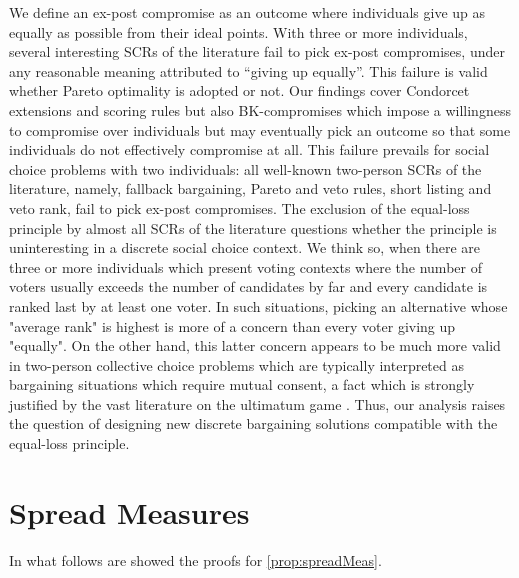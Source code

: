\documentclass[version=3.21, pagesize, twoside=off, bibliography=totoc, DIV=calc, fontsize=12pt, a4paper]{scrartcl}
\begin{document}
We define an ex-post compromise as an outcome where individuals give up as equally as possible from their ideal points. With three or more individuals, several interesting \acp{SCR} of the literature fail to pick ex-post compromises, under any reasonable meaning attributed to “giving up equally”. This failure is valid whether Pareto optimality is adopted or not. Our findings cover Condorcet extensions and scoring rules but also BK-compromises which impose a willingness to compromise over individuals but may eventually pick an outcome so that some individuals do not effectively compromise at all. This failure prevails for social choice problems with two individuals: all well-known two-person \acp{SCR} of the literature, namely, fallback bargaining, Pareto and veto rules, short listing and veto rank, fail to pick ex-post compromises. 
The exclusion of the equal-loss principle by almost all \acp{SCR} of the literature questions whether the principle is uninteresting in a discrete social choice context. We think so, when there are three or more individuals which present voting contexts where the number of voters usually exceeds the number of candidates by far and every candidate is ranked last by at least one voter. In such situations, picking an alternative whose "average rank" is highest is more of a concern than every voter giving up "equally". On the other hand, this latter concern appears to be much more valid in two-person collective choice problems which are typically interpreted as bargaining situations which require mutual consent, a fact which is strongly justified by the vast literature on the ultimatum game \citep{Werner2014}. Thus, our analysis raises the question of designing new discrete bargaining solutions compatible with the equal-loss principle.   



\appendix

\newcommand{\smad}{\sigma_\text{mad}}

\section{Spread Measures}
\label{apdx:proofSM}
In what follows are showed the proofs for \cref{prop:spreadMeas}.
\end{document}
